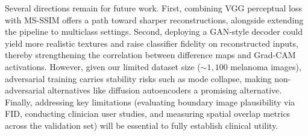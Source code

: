 \documentclass[conference,compsoc]{IEEEtran}
\begin{document}
Several directions remain for future work. First, combining VGG perceptual loss with MS-SSIM offers a path toward sharper reconstructions, alongside extending the pipeline to multiclass settings. Second, deploying a GAN-style decoder could yield more realistic textures and raise classifier fidelity on reconstructed inputs, thereby strengthening the correlation between difference maps and Grad-CAM activations. However, given our limited dataset size ($\sim 1{,}100$ melanoma images), adversarial training carries stability risks such as mode collapse, making non-adversarial alternatives like diffusion autoencoders \cite{daecf} a promising alternative. Finally, addressing key limitations (evaluating boundary image plausibility via FID, conducting clinician user studies, and measuring spatial overlap metrics across the validation set) will be essential to fully establish clinical utility.



\end{document}
